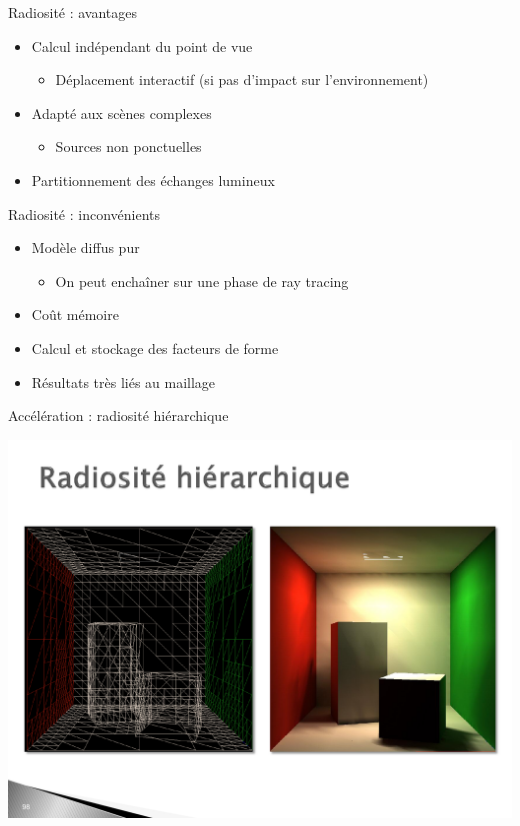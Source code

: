 \begin{frame}{Radiosité : avantages}
    \begin{itemize}
        \item Calcul indépendant du point de vue
        \begin{itemize}
            \item Déplacement interactif (si pas d'impact sur l'environnement)
        \end{itemize}
        \item Adapté aux scènes complexes 
        \begin{itemize}
            \item Sources non ponctuelles 
        \end{itemize}
        \item Partitionnement des échanges lumineux
    \end{itemize}
\end{frame}

\begin{frame}{Radiosité : inconvénients}
    \begin{itemize}
        \item Modèle diffus pur 
        \begin{itemize}
            \item On peut enchaîner sur une phase de ray tracing 
        \end{itemize}
        \item Coût mémoire
        \item Calcul et stockage des facteurs de forme 
        \item Résultats très liés au maillage 
    \end{itemize}
\end{frame}

\begin{frame}{Accélération : radiosité hiérarchique}
    \begin{center}
        \includegraphics[width=.9\textwidth]{figs/radiosite-hierarchique.pdf}
\end{center}
\end{frame}

